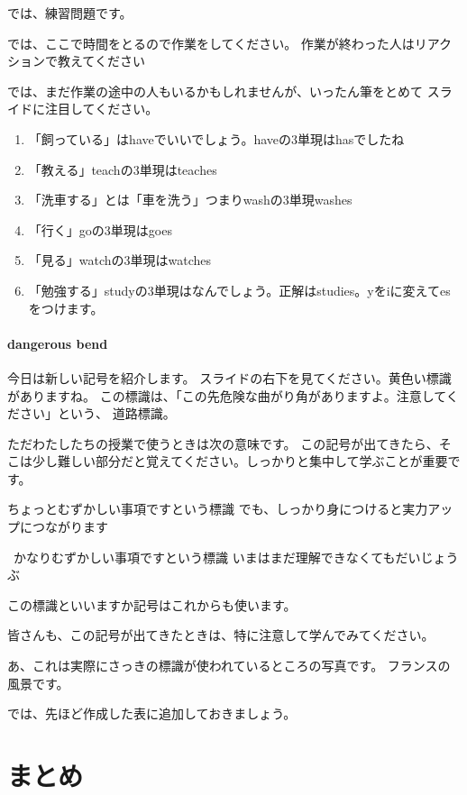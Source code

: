 \documentclass[book,jafontscale=0.9247]{jlreq}
\newcommand{\mySagyo}{%
\par%
\bigskip
では、ここで時間をとるので作業をしてください。
作業が終わった人はリアクションで教えてください\par%
\begin{minipage}[t]{.98\textwidth}
\mbox{}\hrulefill\mbox{}\par%
\mbox{}\hfill{}\raisebox{-.5\height}{作業}\hfill\mbox{}\par%
\mbox{}\hrulefill\mbox{}
\end{minipage}%
\par%
\bigskip%
では、まだ作業の途中の人もいるかもしれませんが、いったん筆をとめて
スライドに注目してください。%
\par%
\bigskip
}
\begin{document}
では、練習問題です。

\mySagyo

\begin{enumerate}
 \item 「飼っている」はhaveでいいでしょう。haveの3単現はhasでしたね
 \item 「教える」teachの3単現はteaches
 \item 「洗車する」とは「車を洗う」つまりwashの3単現washes
 \item 「行く」goの3単現はgoes
 \item 「見る」watchの3単現はwatches
 \item 「勉強する」studyの3単現はなんでしょう。正解はstudies。yをiに変えてesをつけます。
\end{enumerate}


\paragraph{dangerous bend}

今日は新しい記号を紹介します。
スライドの右下を見てください。黄色い標識がありますね。
この標識は、「この先危険な曲がり角がありますよ。注意してください」という、
道路標識。


ただわたしたちの授業で使うときは次の意味です。
この記号が出てきたら、そこは少し難しい部分だと覚えてください。しっかりと集中して学ぶことが重要です。




\dbend\hspace{10pt}%
ちょっとむずかしい事項ですという標識
でも、しっかり身につけると実力アップにつながります

\bigskip

\dbend\,\dbend\hspace{10pt}%
かなりむずかしい事項ですという標識
いまはまだ理解できなくてもだいじょうぶ

この標識といいますか記号はこれからも使います。

皆さんも、この記号が出てきたときは、特に注意して学んでみてください。

あ、これは実際にさっきの標識が使われているところの写真です。
フランスの風景です。


では、先ほど作成した表に追加しておきましょう。

\section{まとめ}
\end{document}
